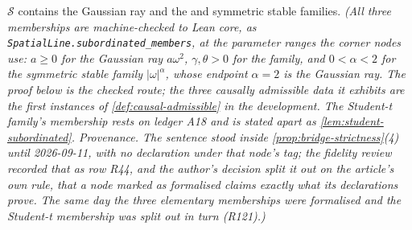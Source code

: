 \begin{lemma}\label{lem:subordinated-members}
\leanok
{}
$\mathcal{S}$ contains the Gaussian ray and the \Matern{} and symmetric stable families.
\statusT\quad\emph{(All three memberships are machine-checked to Lean core, as
\texttt{SpatialLine.subordinated\_members}, at the parameter ranges the corner nodes use:
$a \ge 0$ for the Gaussian ray $a\omega^2$, $\gamma, \theta > 0$ for the \Matern{} family, and
$0 < \alpha < 2$ for the symmetric stable family $|\omega|^\alpha$, whose endpoint $\alpha = 2$
is the Gaussian ray. The proof below is the checked route; the three causally admissible data it
exhibits are the first instances of \ref{def:causal-admissible} in the development. The
Student-t family's membership rests on ledger A18 and is stated apart as
\ref{lem:student-subordinated}.
\emph{Provenance.} The sentence stood inside \ref{prop:bridge-strictness}(4) until 2026-09-11,
with no declaration under that node's tag; the fidelity review recorded that as row R44, and the
author's decision split it out on the article's own rule, that a node marked as formalised claims
exactly what its declarations prove. The same day the three elementary memberships were
formalised and the Student-t membership was split out in turn (R121).)}
\end{lemma}

